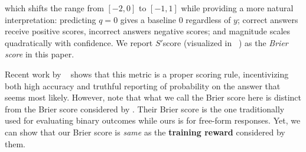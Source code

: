 which shifts the range from $[-2,0]$ to $[-1,1]$ while providing a more natural interpretation: predicting $q=0$ gives a baseline $0$ regardless of $y$; correct answers receive positive scores, incorrect answers negative scores; and magnitude scales quadratically with confidence. We report $S'$score (visualized in ~) as the \emph{Brier score} in this paper. 

Recent work by ~\citet{damani2025beyond} shows that this metric is a proper scoring rule, incentivizing both high accuracy and truthful reporting of probability on the answer that seems most likely. However, note that what we call the Brier score here is distinct from the Brier score considered by \citet{damani2025beyond}. Their Brier score is the one traditionally used for evaluating binary outcomes while ours is for free-form responses. Yet, we can show that our Brier score is \textit{same} as the \textbf{training reward} considered by them.
\clearpage
